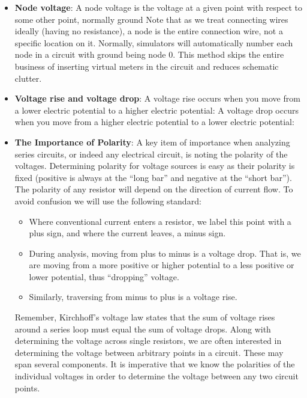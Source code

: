 \documentclass{report}
\begin{document}
\begin{itemize}
\begin{itemize}
            \end{itemize}
        \item \textbf{Node voltage}: A node voltage is the voltage at a given point with respect to some other point, normally ground
            \bigbreak \noindent 
            Note that as we treat connecting wires ideally (having no resistance), a node is the entire connection wire, not a specific location on it. Normally, simulators will automatically number each node in a circuit with ground being node 0. This method skips the entire business of inserting virtual meters in the circuit and reduces schematic clutter.
        \item \textbf{Voltage rise and voltage drop}: A voltage rise occurs when you move from a lower electric potential to a higher electric potential:
            \bigbreak \noindent 
            A voltage drop occurs when you move from a higher electric potential to a lower electric potential:
        \item \textbf{The Importance of Polarity}: A key item of importance when analyzing series circuits, or indeed any electrical circuit, is noting the polarity of the voltages. 
            \bigbreak \noindent 
            Determining polarity for voltage sources is easy as their polarity is fixed (positive is always at the “long bar” and negative at the “short bar”). The polarity of any resistor will depend on the direction of current flow. To avoid confusion we will use the following standard:
            \begin{itemize}
                \item Where conventional current enters a resistor, we label this point with a plus sign, and where the current leaves, a minus sign.
                \item During analysis, moving from plus to minus is a voltage drop. That is, we are moving from a more positive or higher potential to a less positive or lower potential, thus “dropping” voltage.
                \item Similarly, traversing from minus to plus is a voltage rise.
            \end{itemize}
            Remember, Kirchhoff's voltage law states that the sum of voltage rises around a series loop must equal the sum of voltage drops.
            \bigbreak \noindent 
            Along with determining the voltage across single resistors, we are often interested in determining the voltage between arbitrary points in a circuit. These may span several components. It is imperative that we know the polarities of the individual voltages in order to determine the voltage between any two circuit points.

\end{itemize}
\end{document}
